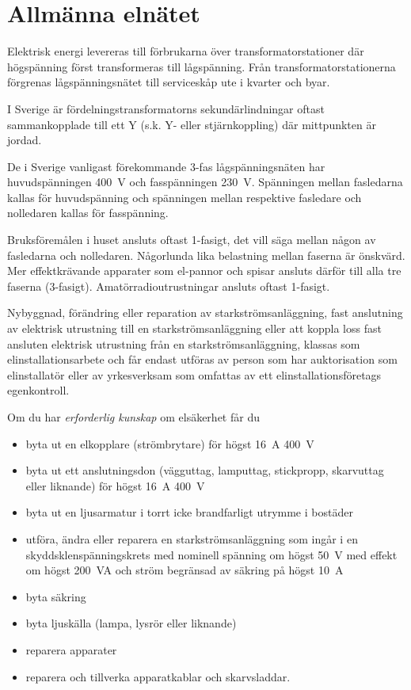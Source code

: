 \section{Allmänna elnätet}
\label{jordning}

Elektrisk energi levereras till förbrukarna över transformatorstationer där
högspänning först transformeras till lågspänning.
Från transformatorstationerna förgrenas lågspänningsnätet till serviceskåp ute
i kvarter och byar.

I Sverige är fördelningstransformatorns sekundärlindningar oftast sammankopplade
till ett Y (s.k. Y- eller stjärnkoppling) där mittpunkten är jordad.

De i Sverige vanligast förekommande 3-fas lågspänningsnäten har huvudspänningen
\qty{400}{\volt} och fasspänningen \qty{230}{\volt}.
Spänningen mellan fasledarna kallas för huvudspänning och spänningen mellan
respektive fasledare och nolledaren kallas för fasspänning.

Bruksföremålen i huset ansluts oftast 1-fasigt, det vill säga mellan någon av
fasledarna och nolledaren.
Någorlunda lika belastning mellan faserna är önskvärd.
Mer effektkrävande apparater som el-pannor och spisar ansluts därför till alla
tre faserna (3-fasigt).
Amatörradioutrustningar ansluts oftast 1-fasigt.

Nybyggnad, förändring eller reparation av starkströmsanläggning,
fast anslutning av elektrisk utrustning till en starkströmsanläggning
eller att koppla loss fast ansluten elektrisk utrustning från en
starkströmsanläggning, klassas som elinstallationsarbete och får endast
utföras av person som har auktorisation som elinstallatör eller av
yrkesverksam som omfattas av ett elinstallationsföretags egenkontroll.

Om du har \emph{erforderlig kunskap} om elsäkerhet får du

\begin{itemize}
\item byta ut en elkopplare (strömbrytare) för högst \qty{16}{\ampere} \qty{400}{\volt}
\item byta ut ett anslutningsdon (vägguttag, lamputtag, stickpropp,
skarvuttag eller liknande) för högst \qty{16}{\ampere} \qty{400}{\volt}
\item byta ut en ljusarmatur i torrt icke brandfarligt utrymme i bostäder
\item utföra, ändra eller reparera en starkströmsanläggning som ingår i en
skyddsklenspänningskrets med nominell spänning om högst \qty{50}{\volt} med
effekt om högst \qty{200}{VA} och ström begränsad av säkring på högst \qty{10}{\ampere}
\item byta säkring
\item byta ljuskälla (lampa, lysrör eller liknande)
\item reparera apparater
\item reparera och tillverka apparatkablar och skarvsladdar.
\end{itemize}

